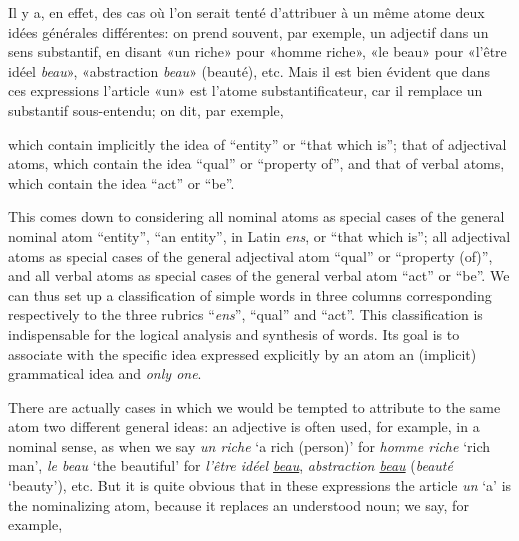 \begin{sloppypar}
{  Il y a, en effet, des cas où l’on serait tenté d’attribuer à un même
  atome deux idées générales différentes: on prend souvent, par
  exemple, un adjectif dans un sens substantif, en disant «un riche»
  pour «homme riche», «le beau» pour «l’être idéel \emph{beau}»,
  «abstraction \emph{beau}» (beauté), etc. Mais il est bien évident
  que dans ces expressions l'article «un» est l’atome
  substantificateur, car il remplace un substantif sous-entendu; on
  dit, par exemple, }%
{\noindent which contain implicitly the idea of ``entity'' or ``that
  which is''; that of adjectival atoms, which contain the idea
  ``qual'' or ``property of'', and that of verbal atoms, which contain
  the idea ``act'' or ``be''.

  This comes down to considering all nominal atoms as special cases of
  the general nominal atom ``entity'', ``an entity'', in Latin
  \emph{ens}, or ``that which is''; all adjectival atoms as special
  cases of the general adjectival atom ``qual'' or ``property (of)'',
  and all verbal atoms as special cases of the general verbal atom
  ``act'' or ``be''. We can thus set up a classification of simple
  words in three columns corresponding respectively to the three
  rubrics ``\emph{ens}'', ``qual'' and ``act''. This classification is
  indispensable for the logical analysis and synthesis of words. Its
  goal is to associate with the specific idea expressed explicitly by
  an atom an (implicit) grammatical idea and \emph{only one}.

  There are actually cases in which we would be tempted to attribute
  to the same atom two different general ideas: an adjective is often
  used, for example, in a nominal sense, as when we say \emph{un
    riche} `a rich (person)' for \emph{homme riche} `rich man',
  \emph{le beau} `the beautiful' for \emph{l'être idéel
    \underline{beau}}, \emph{abstraction \underline{beau}}
  (\emph{beauté} `beauty'), etc. But it is quite obvious that in
  these expressions the article \emph{un} `a' is the nominalizing
  atom, because it replaces an understood noun; we say, for example, }


\end{sloppypar}
